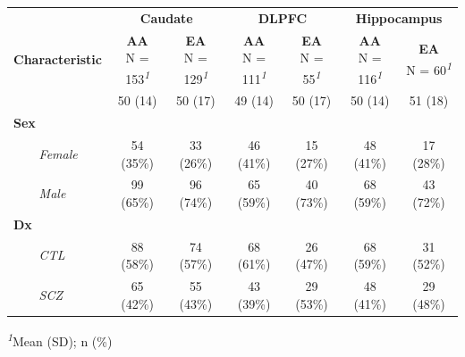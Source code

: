 \begin{table}[t]
\fontsize{12.0pt}{14.0pt}\selectfont
\begin{tabular*}{\linewidth}{@{\extracolsep{\fill}}lcccccc}
\toprule
 & \multicolumn{2}{c}{\textbf{Caudate}} & \multicolumn{2}{c}{\textbf{DLPFC}} & \multicolumn{2}{c}{\textbf{Hippocampus}} \\ 
\cmidrule(lr){2-3} \cmidrule(lr){4-5} \cmidrule(lr){6-7}
\textbf{Characteristic} & \shortstack[l]{\textbf{AA} \\N = 153}\textsuperscript{\textit{1}} & \shortstack[l]{\textbf{EA} \\N = 129}\textsuperscript{\textit{1}} & \shortstack[l]{\textbf{AA} \\N = 111}\textsuperscript{\textit{1}} & \shortstack[l]{\textbf{EA} \\N = 55}\textsuperscript{\textit{1}} & \shortstack[l]{\textbf{AA} \\N = 116}\textsuperscript{\textit{1}} & \shortstack[l]{\textbf{EA} \\N = 60}\textsuperscript{\textit{1}} \\ 
\midrule\addlinespace[2.5pt]
{\bfseries Age} & 50 (14) & 50 (17) & 49 (14) & 50 (17) & 50 (14) & 51 (18) \\ 
{\bfseries Sex} &  &  &  &  &  &  \\ 
{\itshape     Female} & 54 (35\%) & 33 (26\%) & 46 (41\%) & 15 (27\%) & 48 (41\%) & 17 (28\%) \\ 
{\itshape     Male} & 99 (65\%) & 96 (74\%) & 65 (59\%) & 40 (73\%) & 68 (59\%) & 43 (72\%) \\ 
{\bfseries Dx} &  &  &  &  &  &  \\ 
{\itshape     CTL} & 88 (58\%) & 74 (57\%) & 68 (61\%) & 26 (47\%) & 68 (59\%) & 31 (52\%) \\ 
{\itshape     SCZ} & 65 (42\%) & 55 (43\%) & 43 (39\%) & 29 (53\%) & 48 (41\%) & 29 (48\%) \\ 
\bottomrule
\end{tabular*}
\begin{minipage}{\linewidth}
\textsuperscript{\textit{1}}Mean (SD); n (\%)\\
\end{minipage}
\end{table}

